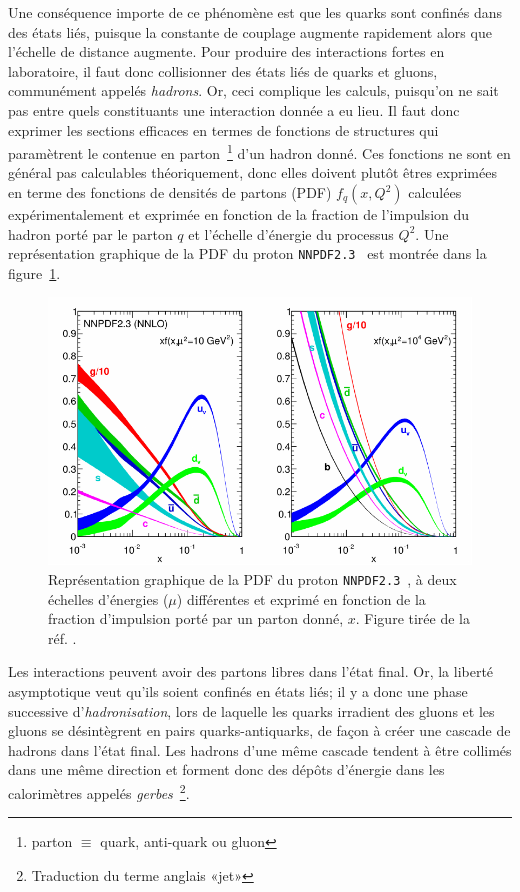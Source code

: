 Une conséquence importe de ce phénomène est que les quarks sont
confinés dans des états liés, puisque la constante de couplage
augmente rapidement alors que l'échelle de distance augmente. Pour
produire des interactions fortes en laboratoire, il faut donc
collisionner des états liés de quarks et gluons, communément appelés
\emph{hadrons}. Or, ceci complique les calculs, puisqu'on ne sait pas
entre quels constituants une interaction donnée a eu lieu. Il faut
donc exprimer les sections efficaces en termes de fonctions de
structures qui paramètrent le contenue en parton~\footnote{parton
  $\equiv$ quark, anti-quark ou gluon} d'un hadron donné. Ces
fonctions ne sont en général pas calculables théoriquement, donc elles
doivent plutôt êtres exprimées en terme des fonctions de densités de
partons (PDF) $f_q(x,Q^2)$ calculées expérimentalement et exprimée en
fonction de la fraction de l'impulsion du hadron porté par le parton
$q$ et l'échelle d'énergie du processus $Q^2$. Une représentation
graphique de la PDF du proton
\texttt{NNPDF2.3}~\cite{ball_parton_2013} est montrée dans la
figure~\ref{fig:pdf}.

\begin{figure}
  \centering
  \includegraphics{nnpdf23.pdf}
  \caption{Représentation graphique de la PDF du proton
    \texttt{NNPDF2.3}~\cite{ball_parton_2013}, à deux échelles
    d'énergies ($\mu$) différentes et exprimé en fonction de la
    fraction d'impulsion porté par un parton donné, $x$. Figure tirée de la
    réf. \cite{olive_review_2014}.}
  \label{fig:pdf}
\end{figure}

Les interactions peuvent avoir des partons libres dans l'état
final. Or, la liberté asymptotique veut qu'ils soient confinés en
états liés; il y a donc une phase successive d'\emph{hadronisation},
lors de laquelle les quarks irradient des gluons et les gluons se
désintègrent en pairs quarks-antiquarks, de façon à créer une cascade
de hadrons dans l'état final. Les hadrons d'une même cascade tendent à
être collimés dans une même direction et forment donc des dépôts
d'énergie dans les calorimètres appelés
\emph{gerbes}~\footnote{Traduction du terme anglais «jet»}. 

